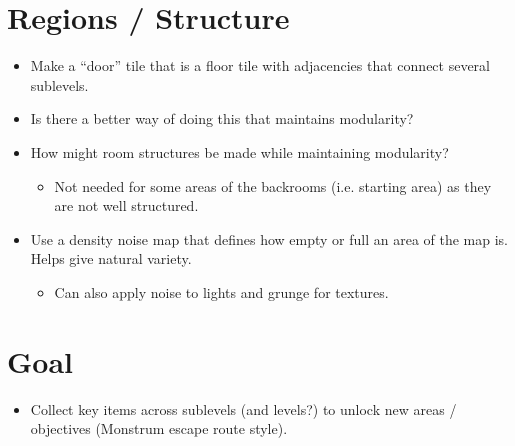 \section*{Regions / Structure}
\begin{itemize}
    \item Make a ``door'' tile that is a floor tile with adjacencies that connect several sublevels.
    \item Is there a better way of doing this that maintains modularity?
    \item How might room structures be made while maintaining modularity?
    \begin{itemize}
        \item Not needed for some areas of the backrooms (i.e. starting area) as they are not well structured.
    \end{itemize}
    \item Use a density noise map that defines how empty or full an area of the map is. Helps give natural variety.
    \begin{itemize}
        \item Can also apply noise to lights and grunge for textures.
    \end{itemize}
\end{itemize}

\section*{Goal}
\begin{itemize}
    \item Collect key items across sublevels (and levels?) to unlock new areas / objectives (Monstrum escape route style).
\end{itemize}

